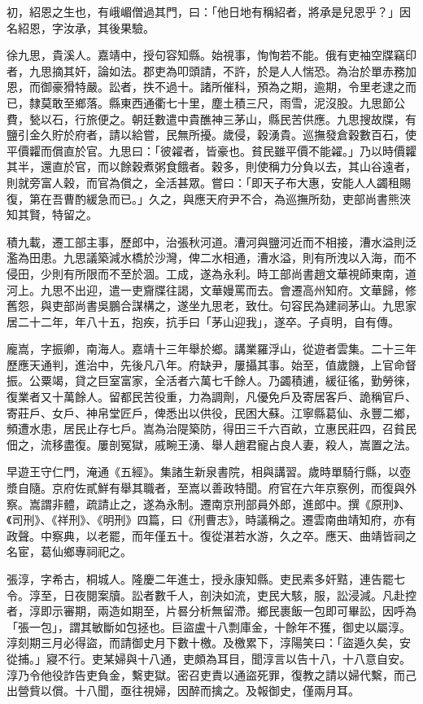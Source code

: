 \begin{pinyinscope}
初，紹恩之生也，有峨嵋僧過其門，曰：「他日地有稱紹者，將承是兒恩乎？」因名紹恩，字汝承，其後果驗。

徐九思，貴溪人。嘉靖中，授句容知縣。始視事，恂恂若不能。俄有吏袖空牒竊印者，九思摘其奸，論如法。郡吏為叩頭請，不許，於是人人惴恐。為治於單赤務加恩，而御豪猾特嚴。訟者，抶不過十。諸所催科，預為之期，逾期，令里老逮之而已，隸莫敢至鄉落。縣東西通衢七十里，塵土積三尺，雨雪，泥沒股。九思節公費，甃以石，行旅便之。朝廷數遣中貴醮神三茅山，縣民苦供應。九思搜故牒，有鹽引金久貯於府者，請以給嘗，民無所擾。歲侵，穀湧貴。巡撫發倉穀數百石，使平價糶而償直於官。九思曰：「彼糴者，皆豪也。貧民雖平價不能糴。」乃以時價糶其半，還直於官，而以餘穀煮粥食餓者。穀多，則使稱力分負以去，其山谷遠者，則就旁富人穀，而官為償之，全活甚眾。嘗曰：「即天子布大惠，安能人人蠲租賜復，第在吾曹酌緩急而已。」久之，與應天府尹不合，為巡撫所劾，吏部尚書熊浹知其賢，特留之。

積九載，遷工部主事，歷郎中，治張秋河道。漕河與鹽河近而不相接，漕水溢則泛濫為田患。九思議築減水橋於沙灣，俾二水相通，漕水溢，則有所洩以入海，而不侵田，少則有所限而不至於涸。工成，遂為永利。時工部尚書趙文華視師東南，道河上。九思不出迎，遣一吏齎牒往謁，文華嫚罵而去。會遷高州知府。文華歸，修舊怨，與吏部尚書吳鵬合謀構之，遂坐九思老，致仕。句容民為建祠茅山。九思家居二十二年，年八十五，抱疾，抗手曰「茅山迎我」，遂卒。子貞明，自有傳。

龐嵩，字振卿，南海人。嘉靖十三年舉於鄉。講業羅浮山，從遊者雲集。二十三年歷應天通判，進治中，先後凡八年。府缺尹，屢攝其事。始至，值歲饑，上官命督振。公粟竭，貸之巨室富家，全活者六萬七千餘人。乃蠲積逋，緩征徭，勤勞徠，復業者又十萬餘人。留都民苦役重，力為調劑，凡優免戶及寄居客戶、詭稱官戶、寄莊戶、女戶、神帛堂匠戶，俾悉出以供役，民困大蘇。江寧縣葛仙、永豐二鄉，頻遭水患，居民止存七戶。嵩為治隄築防，得田三千六百畝，立惠民莊四，召貧民佃之，流移盡復。屢剖冤獄，戚畹王湧、舉人趙君寵占良人妻，殺人，嵩置之法。

早遊王守仁門，淹通《五經》。集諸生新泉書院，相與講習。歲時單騎行縣，以壺漿自隨。京府佐貳鮮有舉其職者，至嵩以善政特聞。府官在六年京察例，而復與外察。嵩謂非體，疏請止之，遂為永制。遷南京刑部員外郎，進郎中。撰《原刑》、《司刑》、《祥刑》、《明刑》四篇，曰《刑曹志》，時議稱之。遷雲南曲靖知府，亦有政聲。中察典，以老罷，而年僅五十。復從湛若水游，久之卒。應天、曲靖皆祠之名宦，葛仙鄉專祠祀之。

張淳，字希古，桐城人。隆慶二年進士，授永康知縣。吏民素多奸黠，連告罷七令。淳至，日夜閱案牘。訟者數千人，剖決如流，吏民大駭，服，訟浸減。凡赴控者，淳即示審期，兩造如期至，片晷分析無留滯。鄉民裹飯一包即可畢訟，因呼為「張一包」，謂其敏斷如包拯也。巨盜盧十八剽庫金，十餘年不獲，御史以屬淳。淳刻期三月必得盜，而請御史月下數十檄。及檄累下，淳陽笑曰：「盜遁久矣，安從捕。」寢不行。吏某婦與十八通，吏頗為耳目，聞淳言以告十八，十八意自安。淳乃令他役詐告吏負金，繫吏獄。密召吏責以通盜死罪，復教之請以婦代繫，而己出營貲以償。十八聞，亟往視婦，因醉而擒之。及報御史，僅兩月耳。


\end{pinyinscope}
